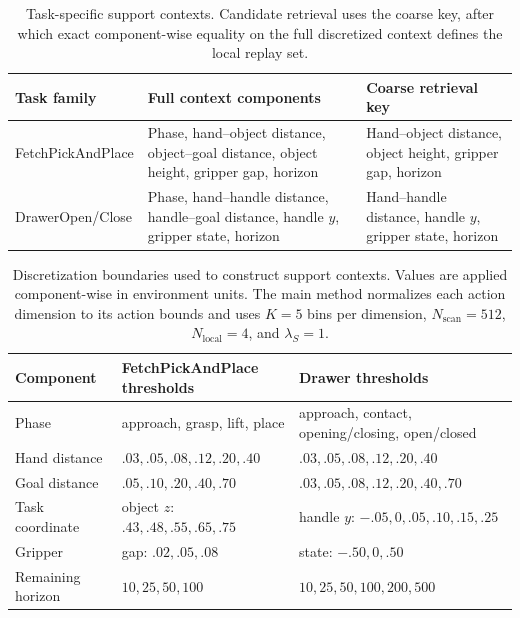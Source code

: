 \begin{table}[t]
\centering
\small
\setlength{\tabcolsep}{5pt}
\begin{tabular}{>{\raggedright\arraybackslash}p{}
                >{\raggedright\arraybackslash}p{}
                >{\raggedright\arraybackslash}p{}}
\toprule
Task family & Full context components & Coarse retrieval key \\
\midrule
FetchPickAndPlace & Phase, hand--object distance, object--goal distance,
object height, gripper gap, horizon & Hand--object distance, object height,
gripper gap, horizon \\
DrawerOpen/Close & Phase, hand--handle distance, handle--goal distance,
handle \(y\), gripper state, horizon & Hand--handle distance, handle \(y\),
gripper state, horizon \\
\bottomrule
\end{tabular}
\caption{Task-specific support contexts. Candidate retrieval uses the coarse
key, after which exact component-wise equality on the full discretized context
defines the local replay set.}
\label{tab:supp-context-components}
\end{table}

\begin{table}[t]
\centering
\small
\setlength{\tabcolsep}{4pt}
\begin{tabular}{>{\raggedright\arraybackslash}p{}
                >{\raggedright\arraybackslash}p{}
                >{\raggedright\arraybackslash}p{}}
\toprule
Component & FetchPickAndPlace thresholds & Drawer thresholds \\
\midrule
Phase & approach, grasp, lift, place & approach, contact, opening/closing, open/closed \\
Hand distance & \(.03,.05,.08,.12,.20,.40\) & \(.03,.05,.08,.12,.20,.40\) \\
Goal distance & \(.05,.10,.20,.40,.70\) & \(.03,.05,.08,.12,.20,.40,.70\) \\
Task coordinate & object \(z\): \(.43,.48,.55,.65,.75\) & handle \(y\): \(-.05,0,.05,.10,.15,.25\) \\
Gripper & gap: \(.02,.05,.08\) & state: \(-.50,0,.50\) \\
Remaining horizon & \(10,25,50,100\) & \(10,25,50,100,200,500\) \\
\bottomrule
\end{tabular}
\caption{Discretization boundaries used to construct support contexts. Values
are applied component-wise in environment units. The main method normalizes
each action dimension to its action bounds and uses \(K=5\) bins per
dimension, \(N_{\mathrm{scan}}=512\), \(N_{\mathrm{local}}=4\), and
\(\lambda_S=1\).}
\label{tab:supp-context-thresholds}
\end{table}
